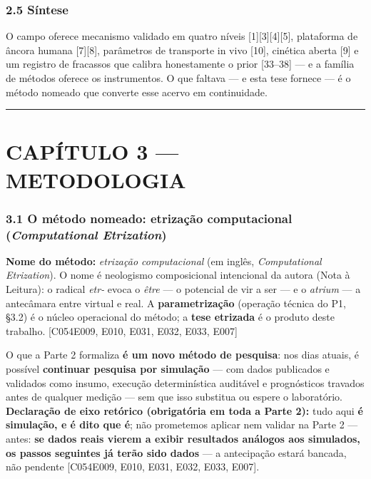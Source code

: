 \documentclass[
  10pt,
]{article}
\begin{document}
\hypertarget{suxedntese}{%
\subsubsection{2.5 Síntese}\label{suxedntese}}

O campo oferece mecanismo validado em quatro níveis
{[}1{]}{[}3{]}{[}4{]}{[}5{]}, plataforma de âncora humana
{[}7{]}{[}8{]}, parâmetros de transporte in vivo {[}10{]}, cinética
aberta {[}9{]} e um registro de fracassos que calibra honestamente o
prior {[}33--38{]} --- e a família de métodos oferece os instrumentos. O
que faltava --- e esta tese fornece --- é o método nomeado que converte
esse acervo em continuidade.

\begin{center}\rule{0.5\linewidth}{0.5pt}\end{center}

\hypertarget{capuxedtulo-3-metodologia}{%
\section{CAPÍTULO 3 --- METODOLOGIA}\label{capuxedtulo-3-metodologia}}

\hypertarget{o-muxe9todo-nomeado-etrizauxe7uxe3o-computacional-computational-etrization}{%
\subsubsection{\texorpdfstring{3.1 O método nomeado: etrização
computacional (\emph{Computational
Etrization})}{3.1 O método nomeado: etrização computacional (Computational Etrization)}}\label{o-muxe9todo-nomeado-etrizauxe7uxe3o-computacional-computational-etrization}}

\textbf{Nome do método:} \emph{etrização computacional} (em inglês,
\emph{Computational Etrization}). O nome é neologismo composicional
intencional da autora (Nota à Leitura): o radical \emph{etr-} evoca o
\emph{être} --- o potencial de vir a ser --- e o \emph{atrium} --- a
antecâmara entre virtual e real. A \textbf{parametrização} (operação
técnica do P1, §3.2) é o núcleo operacional do método; a \textbf{tese
etrizada} é o produto deste trabalho. {[}C054\textbar E009, E010, E031,
E032, E033, E007{]}

O que a Parte 2 formaliza \textbf{é um novo método de pesquisa}: nos
dias atuais, é possível \textbf{continuar pesquisa por simulação} ---
com dados publicados e validados como insumo, execução determinística
auditável e prognósticos travados antes de qualquer medição --- sem que
isso substitua ou espere o laboratório. \textbf{Declaração de eixo
retórico (obrigatória em toda a Parte 2):} tudo aqui \textbf{é
simulação, e é dito que é}; não prometemos aplicar nem validar na Parte
2 --- antes: \textbf{se dados reais vierem a exibir resultados análogos
aos simulados, os passos seguintes já terão sido dados} --- a
antecipação estará bancada, não pendente {[}C054\textbar E009, E010,
E031, E032, E033, E007{]}.
\end{document}
